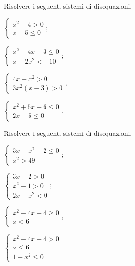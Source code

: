 \begin{esercizio}[\Ast]
 \label{ese:4.75}
Risolvere i seguenti sistemi di disequazioni.
\begin{multicols}{2}
\begin{enumeratea}
\item $\left\{\begin{array}{l}x^2-4>0\\x-5\le 0\end{array}\right.$;
\item $\left\{\begin{array}{l}x^2-4x+3\le 0\\x-2x^2<-10\end{array}\right.$;
\item $\left\{\begin{array}{l}4x-x^2>0\\3x^2(x-3)>0\end{array}\right.$;
\item $\left\{\begin{array}{l}x^2+5x+6\le 0\\2x+5\le 0\end{array}\right.$.
\end{enumeratea}
\end{multicols}
\end{esercizio}

\begin{esercizio}[\Ast]
 \label{ese:4.76}
Risolvere i seguenti sistemi di disequazioni.
\begin{multicols}{2}
\begin{enumeratea}
\item $\left\{\begin{array}{l}3x-x^2-2\le 0\\x^2>49\end{array}\right.$;
\item $\left\{\begin{array}{l}3x-2>0\\x^2-1>0\\2x-x^2<0\end{array}\right.$;
\item $\left\{\begin{array}{l}x^2-4x+4\ge 0\\x<6\end{array}\right.$;
\item $\left\{\begin{array}{l}x^2-4x+4>0\\x\le 6\\1-x^2\le 0\end{array}\right.$.
\end{enumeratea}
\end{multicols}
\end{esercizio}

